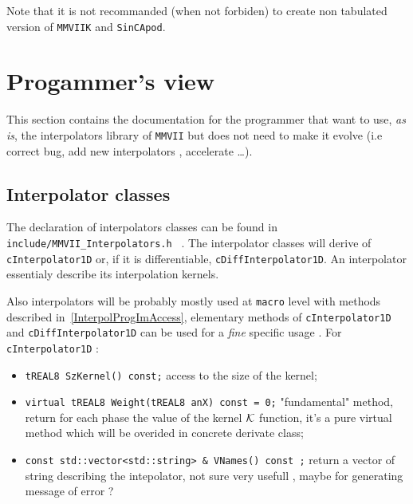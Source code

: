 Note that it is not recommanded (when not forbiden) to create non tabulated version of {\tt MMVIIK} and 
{\tt SinCApod}.


\section{Progammer's view}

This section contains the documentation for the programmer that want to use, \emph{as is}, the
interpolators library of {\tt MMVII} but does not need to make it evolve (i.e correct bug, add new interpolators ,
accelerate \dots).



\subsection{Interpolator classes}

The declaration of interpolators classes can be found in {\tt include/MMVII\_Interpolators.h } .
The interpolator classes will derive of {\tt cInterpolator1D}  or, if it is differentiable,
{\tt cDiffInterpolator1D}.   An interpolator essentialy describe its interpolation kernels.

Also interpolators will be probably mostly used at {\tt macro}
level with  methods described in~\ref{InterpolProgImAccess}, elementary methods
of {\tt cInterpolator1D}  and {\tt cDiffInterpolator1D}
can be used for a \emph{fine} specific usage . For {\tt cInterpolator1D} :

\begin{itemize}
   \item  {\tt tREAL8 SzKernel() const;}  access to the size of the kernel;

   \item  {\tt virtual tREAL8  Weight(tREAL8  anX) const = 0;} "fundamental" method, return
          for each phase the value of the kernel $\mathcal K$  function, it's a pure virtual method
          which will be overided in concrete derivate class;

    \item {\tt const std::vector<std::string> \& VNames() const ;} return a vector of string
          describing the intepolator, not sure very usefull , maybe for generating message of error ?
\end{itemize}

